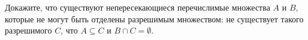 Докажите, что существуют непересекающиеся перечислимые множества $A$ и $B$, которые не могут быть отделены разрешимым
множеством: не существует такого разрешимого $C$, что $A \subseteq C$ и $B \cap C = \emptyset$.